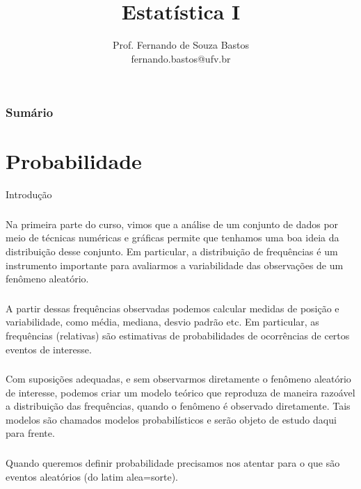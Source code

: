 \documentclass[14pt,aspectratio=1610]{beamer}
\title{Estatística I}
\author{Prof. Fernando de Souza Bastos \texorpdfstring{\\ fernando.bastos@ufv.br}{}}
\institute{Departamento de Estatística \texorpdfstring{\\ Universidade Federal de Viçosa}{}\texorpdfstring{\\ Campus UFV - Viçosa}{}}
\date{}
\begin{document}
%

\frame{\titlepage}

\begin{frame}{}
\frametitle{\bf Sumário}
\tableofcontents
\end{frame}

\section{Probabilidade}
\begin{frame}{Introdução}
\frametitle{}
\begin{block}{}
\justifying
Na primeira parte do curso, vimos que a análise de um conjunto de dados por
meio de técnicas numéricas e gráficas permite que tenhamos uma boa ideia da distribuição desse conjunto. Em particular, a distribuição de frequências é um instrumento
importante para avaliarmos a variabilidade das observações de um fenômeno aleatório.
\end{block}
\end{frame}

\begin{frame}{}
\frametitle{}
\begin{block}{}
\justifying
A partir dessas frequências observadas podemos calcular medidas de posição e
variabilidade, como média, mediana, desvio padrão etc. Em particular, as frequências (relativas) são estimativas de probabilidades de ocorrências
de certos eventos de interesse.
\end{block}
\end{frame}

\begin{frame}{}
\frametitle{}
\begin{block}{}
\justifying
Com suposições adequadas, e sem observarmos diretamente o fenômeno aleatório de interesse, podemos criar um modelo teórico que reproduza de maneira razoável a distribuição das frequências, quando o fenômeno é observado diretamente. Tais modelos são chamados modelos probabilísticos e serão objeto de estudo daqui para frente.
\end{block}
\end{frame}

\begin{frame}{}
\frametitle{}
\begin{block}{}
\justifying
Quando queremos definir probabilidade precisamos nos atentar para o que são eventos aleatórios (do latim alea=sorte). 

\end{block}
\end{frame}
\end{document}
